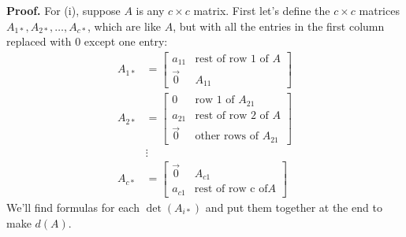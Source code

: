 \documentclass[11pt, letterpaper]{report}
\newenvironment{book}{}{}
\begin{document}
\begin{book}
\textbf{Proof.} For (i), suppose $A$ is any $c\times c$ matrix. First let's define the $c \times c$ matrices $A_{1*}, A_{2*}, \ldots, A_{c*}$, which are like $A$, but with all the entries in the first column replaced with 0 except one entry:
\begin{align*}
A_{1*}&= \begin{bmatrix}
a_{11} & \text{rest of row 1 of }A \\
\vec{0} & A_{11}
\end{bmatrix}\\
A_{2*} &= \begin{bmatrix}
0 & \text{row 1 of }A_{21} \\
a_{21} & \text{rest of row 2 of }A \\
\vec{0} & \text{other rows of }A_{21}
\end{bmatrix} \\
&\vdots \\
A_{c*} &= \begin{bmatrix}
\vec{0} & A_{c1} \\
a_{c1} & \text{rest of row c of} A
\end{bmatrix}
\end{align*}
We'll find formulas for each $\det(A_{i*})$ and put them together at the end to make $d(A)$. 


\end{book}
\end{document}
